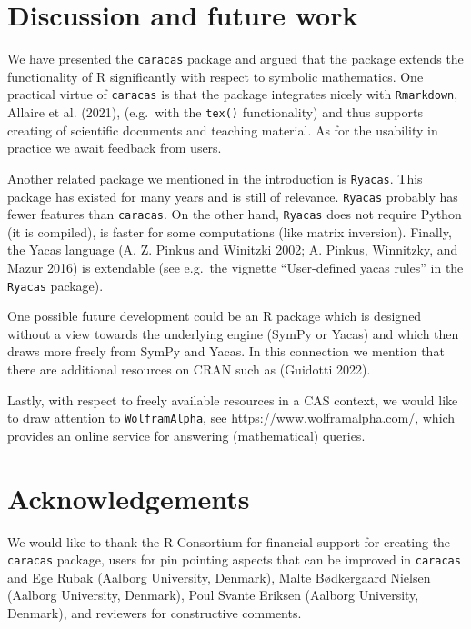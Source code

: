 \hypertarget{discussion-and-future-work}{%
\section{Discussion and future work}\label{discussion-and-future-work}}

We have presented the \texttt{caracas} package and argued that the
package extends the functionality of R significantly with respect to
symbolic mathematics. One practical virtue of \texttt{caracas} is
that the package integrates nicely with \texttt{Rmarkdown},
Allaire et al. (2021), (e.g.~with the \texttt{tex()} functionality) and thus
supports creating of scientific documents and teaching material. As
for the usability in practice we await feedback from users.

Another related package we mentioned in the introduction is \texttt{Ryacas}.
This package has existed for many years and is still of relevance.
\texttt{Ryacas} probably has fewer features than \texttt{caracas}. On the other
hand, \texttt{Ryacas} does not require Python (it is compiled), is faster for
some computations (like matrix inversion). Finally, the Yacas language
(A. Z. Pinkus and Winitzki 2002; A. Pinkus, Winnitzky, and Mazur 2016) is extendable (see e.g.~the vignette
``User-defined yacas rules'' in the \texttt{Ryacas} package).

One possible future development could be an R package which is
designed without a view towards the underlying engine (SymPy or Yacas)
and which then draws more freely from SymPy and Yacas.
In this connection we mention that there are additional resources
on CRAN such as  (Guidotti 2022).

Lastly, with respect to freely available resources in a CAS context, we would
like to draw attention to \texttt{WolframAlpha}, see
\url{https://www.wolframalpha.com/}, which provides an online service for
answering (mathematical) queries.

\hypertarget{acknowledgements}{%
\section{Acknowledgements}\label{acknowledgements}}

We would like to thank the R Consortium for financial support for
creating the \texttt{caracas} package, users for pin pointing aspects
that can be improved in \texttt{caracas} and Ege Rubak (Aalborg
University, Denmark), Malte Bødkergaard Nielsen (Aalborg
University, Denmark), Poul Svante Eriksen (Aalborg
University, Denmark), and reviewers
for constructive comments.



